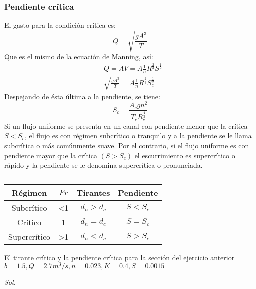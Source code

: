 \subsubsection{Pendiente crítica}
El gasto para la condición crítica es:
\begin{equation}
    Q = \sqrt{\frac{gA^3}{T}}
\end{equation}
Que es el mismo de la ecuación de Manning, así:
\begin{align*}
    &Q = AV = A \frac{1}{n}R^{\frac{2}{3}}S^{\frac{1}{2}}\\
    &\sqrt{\frac{gA^3}{T}} = A \frac{1}{n}R^{\frac{2}{3}}S_c^{\frac{1}{2}}
\end{align*}
Despejando de ésta última a la pendiente, se tiene:
\begin{equation}
    S_c = \frac{A_c gn^2}{T_c R_c^{\frac{4}{3}}}
\end{equation}
Si un flujo uniforme se presenta en un canal con pendiente menor que la crítica $S< S_c$, el flujo es con régimen subcrítico o tranquilo y a la pendiente se le llama subcrítica o más comúnmente suave. Por el contrario, si el flujo uniforme es con  pendiente mayor que la crítica $(S>S_c)$ el escurrimiento es supercrítico o rápido y la pendiente se le denomina supercrítica o pronunciada.
\begin{table}[h!]
    \centering
    \begin{tabular}{@{}cccc@{}}
    \toprule
    Régimen      & $Fr$ & Tirantes  & Pendiente \\ \midrule
    Subcrítico   & <1   & $d_n>d_c$ & $S<S_c$   \\
    Crítico      & 1    & $d_n=d_c$ & $S=S_c$   \\
    Supercrítico & >1   & $d_n<d_c$ & $S>S_c$   \\ \bottomrule
    \end{tabular}
    \caption{}
    \label{tabhb33}
    \end{table}
\begin{example}
    El tirante crítico y la pendiente crítica para la sección del ejercicio anterior $b=1.5,Q=2.7m^3/s,n=0.023,K=0.4, S=0.0015$
\end{example}
\textit{ Sol. }

